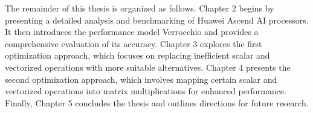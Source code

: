 The remainder of this thesis is organized as follows. Chapter 2 begins by presenting a detailed analysis and benchmarking of Huawei Ascend AI processors. It then introduces the performance model Verrocchio and provides a comprehensive evaluation of its accuracy. Chapter 3 explores the first optimization approach, which focuses on replacing inefficient scalar and vectorized operations with more suitable alternatives. Chapter 4 presents the second optimization approach, which involves mapping certain scalar and vectorized operations into matrix multiplications for enhanced performance. Finally, Chapter 5 concludes the thesis and outlines directions for future research.
